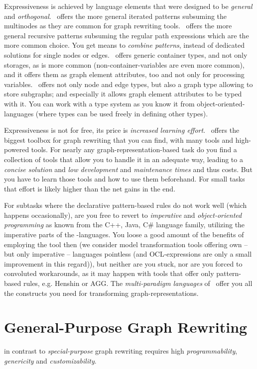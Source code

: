 Expressiveness is achieved by language elements that were designed to be \emph{general} and \emph{orthogonal}.
\GrG\ offers the more general iterated patterns subsuming the multinodes as they are common for graph rewriting tools.
\GrG\ offers the more general recursive patterns subsuming the regular path expressions which are the more common choice.
You get means to \emph{combine patterns}, instead of dedicated solutions for single nodes or edges.
\GrG\ offers generic container types, and not only storages, as is more common (non-container-variables are even more common), and it offers them as graph element attributes, too and not only for processing variables.
\GrG\ offers not only node and edge types, but also a graph type allowing to store subgraphs; and especially it allows graph element attributes to be typed with it.
You can work with a type system as you know it from object-oriented-languages (where types can be used freely in defining other types).

Expressiveness is not for free, its price is \emph{increased learning effort}.
\GrG\ offers the biggest toolbox for graph rewriting that you can find, with many tools and high-powered tools.
For nearly any graph-representation-based task do you find a collection of tools that allow you to handle it in an adequate way, leading to a \emph{concise solution} and \emph{low development} and \emph{maintenance times} and thus costs.
But you have to learn those tools and how to use them beforehand.
For small tasks that effort is likely higher than the net gains in the end.

For subtasks where the declarative pattern-based rules do not work well (which happens occasionally), are you free to revert to \emph{imperative} and \emph{object-oriented programming} as known from the C++, Java, C\# language family, utilizing the imperative parts of the \GrG-languages.
You loose a good amount of the benefits of employing the tool then (we consider model transformation tools offering own -- but only imperative -- languages pointless (and OCL-expressions are only a small improvement in this regard)), but neither are you stuck, nor are you forced to convoluted workarounds, as it may happen with tools that offer only pattern-based rules, e.g. Henshin\cite{Henshin} or AGG\cite{agg}.
The \emph{multi-paradigm languages} of \GrG\ offer you all the constructs you need for transforming graph-representations.

\section{General-Purpose Graph Rewriting}
in contrast to \emph{special-purpose} graph rewriting requires high \emph{programmability}, \emph{genericity} and \emph{customizability}.

